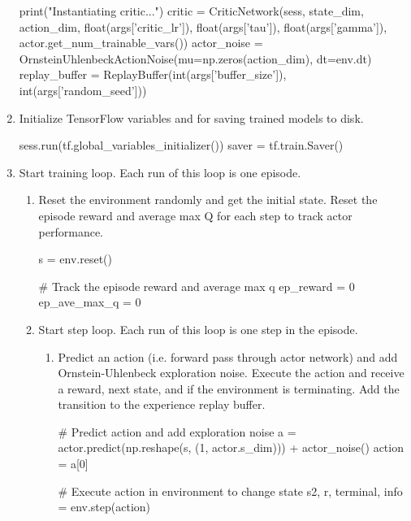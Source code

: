 \begin{enumerate}
\begin{python}[caption={Network, Noise, and Experience Replay Buffer Initialization},label={list:net_init},xleftmargin=\dimexpr-\csname @totalleftmargin\endcsname]
print("Instantiating critic...")
critic = CriticNetwork(sess, state_dim, action_dim,
                       float(args['critic_lr']), float(args['tau']),
                       float(args['gamma']),
                       actor.get_num_trainable_vars())
actor_noise = OrnsteinUhlenbeckActionNoise(mu=np.zeros(action_dim), dt=env.dt)
replay_buffer = ReplayBuffer(int(args['buffer_size']), int(args['random_seed']))
\end{python}
\item Initialize TensorFlow variables and  for saving trained models to disk.
\begin{python}[caption={Saver Initialization},label={list:saver_init},xleftmargin=\dimexpr-\csname @totalleftmargin\endcsname]
sess.run(tf.global_variables_initializer())
saver = tf.train.Saver()
\end{python}
\item Start training loop. Each run of this loop is one episode.
	\begin{enumerate}
	\item Reset the environment randomly and get the initial state. Reset the episode reward and average max Q for each step to track actor performance.
	\begin{python}[caption={Episode Reset},label={list:ep_reset},xleftmargin=\dimexpr-\csname @totalleftmargin\endcsname]
s = env.reset()

# Track the episode reward and average max q
ep_reward = 0
ep_ave_max_q = 0
	\end{python}
	\item Start step loop. Each run of this loop is one step in the episode.
		\begin{enumerate}
		\item Predict an action (i.e. forward pass through actor network) and add Ornstein-Uhlenbeck exploration noise. Execute the action and receive a reward, next state, and if the environment is terminating. Add the transition to the experience replay buffer.
		\begin{python}[caption={Actor Predict and Step},label={list:act_pred_step},xleftmargin=\dimexpr-\csname @totalleftmargin\endcsname]
# Predict action and add exploration noise
a = actor.predict(np.reshape(s, (1, actor.s_dim))) + actor_noise()
action = a[0]

# Execute action in environment to change state
s2, r, terminal, info = env.step(action)


\end{python}
\end{enumerate}
\end{enumerate}
\end{enumerate}
